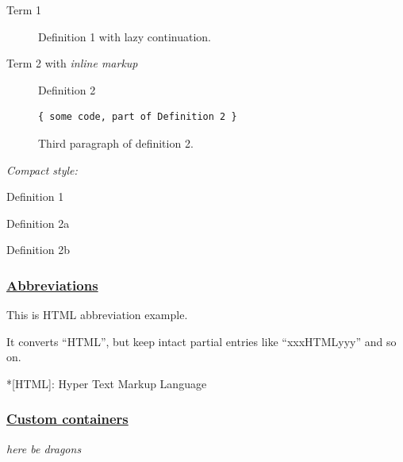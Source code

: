 \documentclass[
  paper=a4,
  ,captions=tableheading
]{scrartcl}
\providecommand{\tightlist}{%
  \setlength{\itemsep}{0pt}\setlength{\parskip}{0pt}}
\begin{document}
\begin{description}
\item[Term 1]
Definition 1 with lazy continuation.
\item[Term 2 with \emph{inline markup}]
Definition 2

\begin{lstlisting}
{ some code, part of Definition 2 }
\end{lstlisting}

Third paragraph of definition 2.
\end{description}

\emph{Compact style:}

\begin{description}
\tightlist
\item[Term 1]
Definition 1
\item[Term 2]
Definition 2a

Definition 2b
\end{description}

\hypertarget{abbreviations}{%
\subsubsection{\texorpdfstring{\href{https://github.com/markdown-it/markdown-it-abbr}{Abbreviations}}{Abbreviations}}\label{abbreviations}}

This is HTML abbreviation example.

It converts ``HTML'', but keep intact partial entries like
``xxxHTMLyyy'' and so on.

*{[}HTML{]}: Hyper Text Markup Language

\hypertarget{custom-containers}{%
\subsubsection{\texorpdfstring{\href{https://github.com/markdown-it/markdown-it-container}{Custom
containers}}{Custom containers}}\label{custom-containers}}

\emph{here be dragons}
\end{document}
